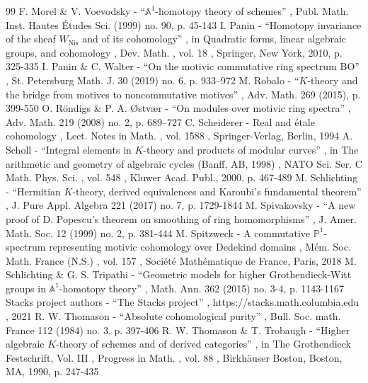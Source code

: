 \documentclass[11pt]{article}
\numberwithin{equation}{section}\renewcommand{\encodingdefault}{TU}
\begin{document}
\begin{thebibliography}{99}
 F. Morel \& V. Voevodsky - “${\mathbb{A}}^1$-homotopy theory of schemes” , Publ. Math. Inst. Hautes Études Sci. (1999) no. 90, p. 45-143
 I. Panin - “Homotopy invariance of the sheaf $W_{\mathrm{Nis}}$ and of its cohomology” , in Quadratic forms, linear algebraic groups, and cohomology , Dev. Math. , vol. 18 , Springer, New York, 2010, p. 325-335
 I. Panin \& C. Walter - “On the motivic commutative ring spectrum BO” , St. Petersburg Math. J. 30 (2019) no. 6, p. 933–972
 M. Robalo - “$K$-theory and the bridge from motives to noncommutative motives” , Adv. Math. 269 (2015), p. 399-550
 O. Röndigs \& P. A. Østvær - “On modules over motivic ring spectra” , Adv. Math. 219 (2008) no. 2, p. 689–727
 C. Scheiderer - Real and étale cohomology , Lect. Notes in Math. , vol. 1588 , Springer-Verlag, Berlin, 1994
 A. Scholl - “Integral elements in $K$-theory and products of modular curves” , in The arithmetic and geometry of algebraic cycles (Banff, AB, 1998) , NATO Sci. Ser. C Math. Phys. Sci. , vol. 548 , Kluwer Acad. Publ., 2000, p. 467-489
 M. Schlichting - “Hermitian $K$-theory, derived equivalences and Karoubi’s fundamental theorem” , J. Pure Appl. Algebra 221 (2017) no. 7, p. 1729-1844
 M. Spivakovsky - “A new proof of D. Popescu’s theorem on smoothing of ring homomorphisms” , J. Amer. Math. Soc. 12 (1999) no. 2, p. 381-444
 M. Spitzweck - A commutative $\mathbb{P}^1$-spectrum representing motivic cohomology over Dedekind domains , Mém. Soc. Math. France (N.S.) , vol. 157 , Société Mathématique de France, Paris, 2018
 M. Schlichting \& G. S. Tripathi - “Geometric models for higher Grothendieck-Witt groups in $\mathbb{A}^1$-homotopy theory” , Math. Ann. 362 (2015) no. 3-4, p. 1143-1167
 Stacks project authors - “The Stacks project” , https://stacks.math.columbia.edu , 2021
 R. W. Thomason - “Absolute cohomological purity” , Bull. Soc. math. France 112 (1984) no. 3, p. 397-406
 R. W. Thomason \& T. Trobaugh - “Higher algebraic $K$-theory of schemes and of derived categories” , in The Grothendieck Festschrift, Vol. III , Progress in Math. , vol. 88 , Birkhäuser Boston, Boston, MA, 1990, p. 247-435
\end{thebibliography}
\end{document}
